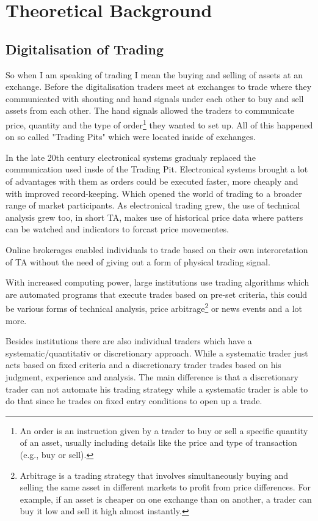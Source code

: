 \documentclass[12pt]{article}
\begin{document}
\newpage

\section{Theoretical Background}
\subsection{Digitalisation of Trading}
So when I am speaking of trading I mean the buying and selling of assets at an exchange. Before the digitalisation traders meet at exchanges to trade where they communicated with shouting and hand signals under each other to buy and sell assets from each other. The hand signals allowed the traders to communicate price, quantity and the type of order\footnote{An order is an instruction given by a trader to buy or sell a specific quantity of an asset, usually including details like the price and type of transaction (e.g., buy or sell).}
they wanted to set up.  All of this happened on so called "Trading Pits" which were located inside of exchanges.


In the late 20th century electronical systems gradualy replaced the communication used insde of the Trading Pit. Electronical systems brought a lot of advantages with them as orders could be executed faster, more cheaply and with improved record-keeping. Which opened the world of trading to a broader range of market participants. 
As electronical trading grew, the use of technical analysis grew too, in short TA, makes use of historical price data where patters can be watched and indicators to forcast price movementes.

Online brokerages enabled individuals to trade based on their own interoretation of TA without the need of giving out a form of physical trading signal.

With increased computing power, large institutions use trading algorithms which are automated programs that execute trades based on pre-set criteria, this could be various forms of technical analysis, price arbitrage\footnote{Arbitrage is a trading strategy that involves simultaneously buying and selling the same asset in different markets to profit from price differences. For example, if an asset is cheaper on one exchange than on another, a trader can buy it low and sell it high almost instantly.} or news events and a lot more.


Besides institutions there are also individual traders which have a systematic/quantitativ or discretionary approach. While a systematic trader just acts based on fixed criteria and a discretionary trader trades based on his judgment, experience and analysis. The main difference is that a discretionary trader can not automate his trading strategy while a systematic trader is able to do that since he trades on fixed entry conditions to open up a trade.
\end{document}
